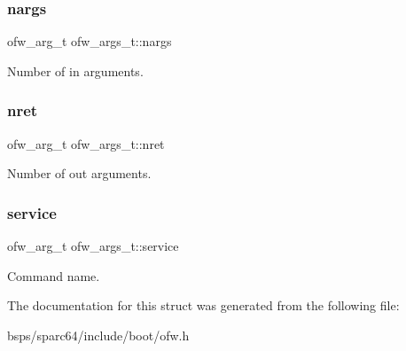 \subsubsection{\texorpdfstring{nargs}{nargs}}
{\footnotesize\ttfamily ofw\+\_\+arg\+\_\+t ofw\+\_\+args\+\_\+t\+::nargs}

Number of in arguments. \mbox{\label{structofw__args__t_a4c83343f10ca0efb931557041280d146}} 
\subsubsection{\texorpdfstring{nret}{nret}}
{\footnotesize\ttfamily ofw\+\_\+arg\+\_\+t ofw\+\_\+args\+\_\+t\+::nret}

Number of out arguments. \mbox{\label{structofw__args__t_a347ca72e15bf76401bd580cc218dca59}} 
\subsubsection{\texorpdfstring{service}{service}}
{\footnotesize\ttfamily ofw\+\_\+arg\+\_\+t ofw\+\_\+args\+\_\+t\+::service}

Command name. 

The documentation for this struct was generated from the following file\+:\begin{DoxyCompactItemize}
\item 
bsps/sparc64/include/boot/ofw.\+h\end{DoxyCompactItemize}
